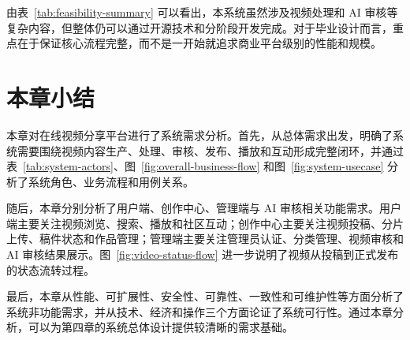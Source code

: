 由表~\ref{tab:feasibility-summary} 可以看出，本系统虽然涉及视频处理和 AI 审核等复杂内容，但整体仍可以通过开源技术和分阶段开发完成。对于毕业设计而言，重点在于保证核心流程完整，而不是一开始就追求商业平台级别的性能和规模。

\section{本章小结}
\label{sec:chapter3-summary}

本章对在线视频分享平台进行了系统需求分析。首先，从总体需求出发，明确了系统需要围绕视频内容生产、处理、审核、发布、播放和互动形成完整闭环，并通过表~\ref{tab:system-actors}、图~\ref{fig:overall-business-flow} 和图~\ref{fig:system-usecase} 分析了系统角色、业务流程和用例关系。

随后，本章分别分析了用户端、创作中心、管理端与 AI 审核相关功能需求。用户端主要关注视频浏览、搜索、播放和社区互动；创作中心主要关注视频投稿、分片上传、稿件状态和作品管理；管理端主要关注管理员认证、分类管理、视频审核和 AI 审核结果展示。图~\ref{fig:video-status-flow} 进一步说明了视频从投稿到正式发布的状态流转过程。

最后，本章从性能、可扩展性、安全性、可靠性、一致性和可维护性等方面分析了系统非功能需求，并从技术、经济和操作三个方面论证了系统可行性。通过本章分析，可以为第四章的系统总体设计提供较清晰的需求基础。
